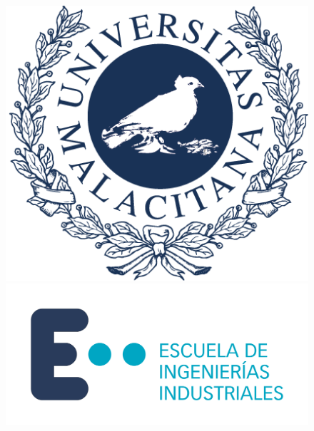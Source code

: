 \begin{center}
\begin{figure}[htbp]
  \centering
  \begin{minipage}[b]{0.2\textwidth}
    \centering
    \includegraphics[width=\textwidth]{images/marcauma.png}
  \end{minipage}
  \hspace{5cm}
  \begin{minipage}[b]{0.4\textwidth}
    \centering
    \includegraphics[width=\textwidth]{images/Logo-EII-horizontal.png}
  \end{minipage}
\end{figure}


\end{center}
